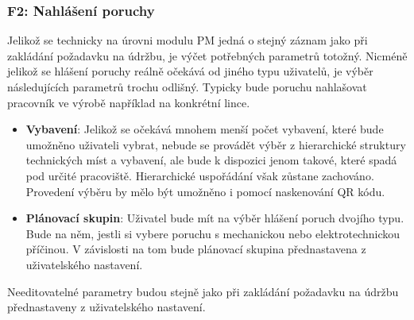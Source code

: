 \documentclass[thesis=M,czech]{FITthesis}[2012/06/26]
\begin{document}
\subsubsection{F2: Nahlášení poruchy}
\label{sscec:fc_nahlaseni_poruchy}
Jelikož se technicky na úrovni modulu PM jedná o stejný záznam jako při zakládání požadavku na údržbu, je výčet potřebných parametrů totožný. Nicméně jelikož se hlášení poruchy reálně očekává od jiného typu uživatelů, je výběr následujících parametrů trochu odlišný. Typicky bude poruchu nahlašovat pracovník ve výrobě například na konkrétní lince. 
\begin{itemize}
	\item
	\textbf{Vybavení}: Jelikož se očekává mnohem menší počet vybavení, které bude umožněno uživateli vybrat, nebude se provádět výběr z hierarchické struktury technických míst a vybavení, ale bude k dispozici jenom takové, které spadá pod určité pracoviště. Hierarchické uspořádání však zůstane zachováno. Provedení výběru by mělo být umožněno i pomocí naskenování QR kódu.  
	\item
	\textbf{Plánovací skupin}: Uživatel bude mít na výběr hlášení poruch dvojího typu. Bude na něm, jestli si vybere poruchu s mechanickou nebo elektrotechnickou příčinou. V závislosti na tom bude plánovací skupina přednastavena z uživatelského nastavení.
\end{itemize} 
Needitovatelné parametry budou stejně jako při zakládání požadavku na údržbu přednastaveny z uživatelského nastavení.
\end{document}
